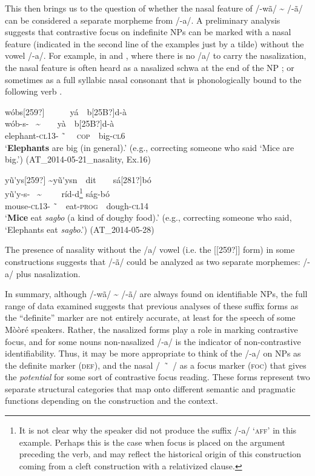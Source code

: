 \documentclass[output=paper]{langsci/langscibook}
\begin{document}
This then brings us to the question of whether the nasal feature of /\nobreakdash-wã/ \~{} /\nobreakdash-ã/ can be considered a separate morpheme from /-a/. A preliminary analysis suggests that contrastive focus on indefinite NPs can be marked with a nasal feature (indicated in the second line of the examples just by a tilde) without the vowel /-a/. For example, in  and , where there is no /a/ to carry the nasalization, the nasal feature is often heard as a nasalized schwa at the end of the NP ; or sometimes as a full syllabic nasal consonant that is phonologically bound to the following verb .


\ea\label{ex:teo:55}
\label{bkm:Ref264214292}wóbs[259?]\ \ \ \ \ \ y\'{a}\ \ b[25B?]d\nobreakdash-à\\
\gll wób\nobreakdash-s\nobreakdash- \ \~{ }\ \ \ \ y\`{a}\ \ b[25B?]d\nobreakdash-à\\
elephant\nobreakdash-\textsc{cl13\nobreakdash- ˜}\textit{ }\textsc{\ \ cop}\ \ big\nobreakdash-\textsc{cl6}\\
\glt ‘\textbf{Elephants} are big (in general).’ (e.g., correcting someone who said ‘Mice are big.’) (AT\_2014-05-21\_nasality, Ex.16)
\z

\ea\label{ex:teo:56}
\label{bkm:Ref264214310}y\~{u}\'{ }ys[259?] \~{}y\~{u}\'{ }ysn\ \ dit\ \ \ \ s\'{a}[281?]b\'{o}\\
\gll y\~{u}\'{ }y-s\nobreakdash- \ \~{ } \ \ \ \ r\'{i}d\nobreakdash-d\footnote{It is not clear why the speaker did not produce the suffix /-a/ ‘\textsc{aff}’ in this example. Perhaps this is the case when focus is placed on the argument preceding the verb, and may reflect the historical origin of this construction coming from a cleft construction with a relativized clause.} s\'{a}g-b\'{o}\\
mouse\nobreakdash-\textsc{cl13- ˜}\ \ eat-\textsc{prog}\ \ dough\nobreakdash-\textsc{cl14}\\
\glt ‘\textbf{Mice} eat \textit{sagbo }(a kind of doughy food).’ (e.g., correcting someone who said, ‘Elephants eat \textit{sagbo}.’) (AT\_2014-05-28)
\z

The presence of nasality without the /a/ vowel (i.e. the [[259?]] form) in some constructions suggests that /\nobreakdash-ã/ could be analyzed as two separate morphemes: /-a/ plus nasalization.


In summary, although /-wã/ \~{} /-ã/ are always found on identifiable NPs, the full range of data examined suggests that previous analyses of these suffix forms as the “definite” marker are not entirely accurate, at least for the speech of some M\`{o}\`{o}r\'{e} speakers. Rather, the nasalized forms play a role in marking contrastive focus, and for some nouns non-nasalized /-a/ is the indicator of non-contrastive identifiability. Thus, it may be more appropriate to think of the /-a/ on NPs as the definite marker (\textsc{def}), and the nasal /~˜~/ as a focus marker (\textsc{foc}) that gives the \textit{potential} for some sort of contrastive focus reading. These forms represent two separate structural categories that map onto different semantic and pragmatic functions depending on the construction and the context.
\end{document}
